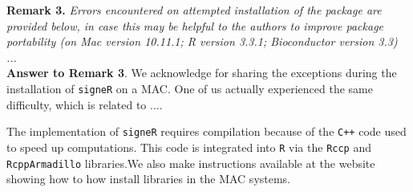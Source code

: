 \documentclass[11pt]{amsart}
\begin{document}
\textbf{Remark 3.}
\emph{Errors encountered on attempted installation of the package are provided below, in case this may be helpful to the authors to improve package portability (on Mac version 10.11.1; R version 3.3.1; Bioconductor version 3.3) ...}
\\

\textbf{Answer to Remark 3}. We acknowledge for sharing the exceptions during the installation of \texttt{signeR} on a MAC. One of us actually experienced the same difficulty, which is related to ....


The implementation of \texttt{signeR} requires compilation because of the \texttt{C++} code used to speed up computations. This code is integrated into \texttt{R} via the \texttt{Rccp} and \texttt{RcppArmadillo} libraries.We also make instructions available at the website showing how to how install libraries in the MAC systems.




\vspace{2.5cm}
\end{document}
